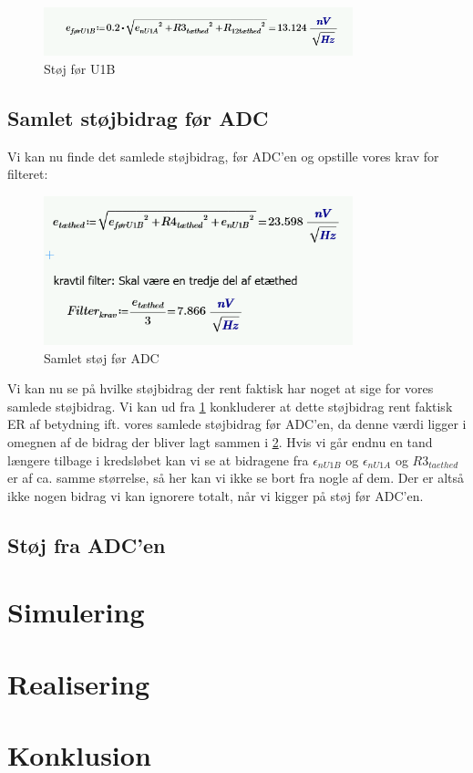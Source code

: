 \documentclass[a4paper, 11pt, article,oneside,openany]{memoir} %
\begin{document}
\begin{figure}[ht] %
	\centering
	\includegraphics[width=0.8\textwidth]{figure/foerU1b}
	\caption{Støj før U1B}
	\label{foerU1b}
\end{figure}



\subsection{Samlet støjbidrag før ADC}


Vi kan nu finde det samlede støjbidrag, før ADC'en og opstille vores krav for filteret:

\begin{figure}[ht] %
	\centering
	\includegraphics[width=0.8\textwidth]{figure/samletstoej}
	\caption{Samlet støj før ADC}
	\label{samletstoej}
\end{figure}


Vi kan nu se på hvilke støjbidrag der rent faktisk har noget at sige for vores samlede støjbidrag. Vi kan ud fra \cref{foerU1b} konkluderer at dette støjbidrag rent faktisk ER af betydning ift. vores samlede støjbidrag før ADC'en, da denne værdi ligger i omegnen af de bidrag der bliver lagt sammen i \cref{samletstoej}. Hvis vi går endnu en tand længere tilbage i kredsløbet kan vi se at bidragene fra $\epsilon_{nU1B}$ og $\epsilon_{nU1A}$ og $R3_{taethed}$ er af ca. samme størrelse, så her kan vi ikke se bort fra nogle af dem. Der er altså ikke nogen bidrag vi kan ignorere totalt, når vi kigger på støj før ADC'en.

\subsection{Støj fra ADC'en}





\section{Simulering}

\section{Realisering}

\section{Konklusion}
\end{document}
